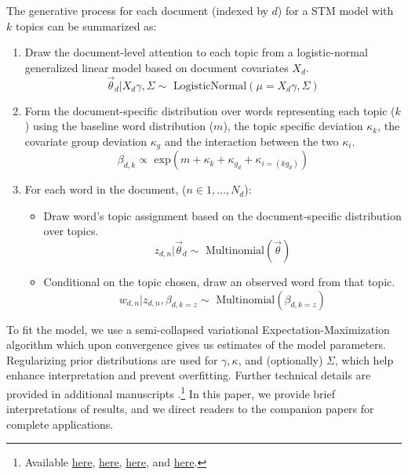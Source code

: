 \documentclass[article,shortnames]{jss}
\begin{document}
The generative process for each document (indexed by $d$) for a STM model with $k$ topics can be summarized as:

\begin{enumerate}
\item Draw the document-level attention to each topic from a logistic-normal generalized linear model based on document covariates $X_d$. \\
\begin{equation}\label{eqn:dgp1}
\vec{\theta}_d | X_d\gamma, \Sigma \sim \text{ LogisticNormal}(\mu = X_d\gamma, \Sigma)
\end{equation}
\item Form the document-specific distribution over words representing each topic ($k$) using the baseline word distribution ($m$), the topic specific deviation $\kappa_k$, the covariate group deviation $\kappa_g$ and the interaction between the two $\kappa_i$.\\
\begin{equation}\label{eqn:dgp2}
\beta_{d,k} \propto  \text{ exp}(m + \kappa_{k} + \kappa_{g_d} + \kappa_{i = (kg_d)})
\end{equation}
\item For each word in the document, ($n \in 1, \dots, N_d$):
\begin{itemize}
\item Draw word's topic assignment based on the document-specific distribution over topics.\\
\begin{equation}\label{eqn:dgp3}
z_{d, n} | \vec{\theta}_d \sim \text{ Multinomial}(\vec{\theta})
\end{equation}
\item Conditional on the topic chosen, draw an observed word from that topic.\\
\begin{equation}\label{eqn:dpg4}
 w_{d, n} | z_{d, n}, \beta_{d, k= z} \sim \text{ Multinomial}(\beta_{d, k = z})
\end{equation}
\end{itemize}
\end{enumerate}

To fit the model, we use a semi-collapsed variational Expectation-Maximization algorithm which upon convergence gives us estimates of the model parameters. Regularizing prior distributions are used for $\gamma, \kappa$, and (optionally) $\Sigma$, which help enhance interpretation and prevent overfitting. Further technical details are provided in additional manuscripts \citep{nips2013,stmjasa,ajps,TextComparative}.\footnote{Available \href{http://scholar.harvard.edu/files/bstewart/files/stmnips2013.pdf}{here}, \href{http://scholar.harvard.edu/files/dtingley/files/comparativepoliticstext.pdf}{here}, \href{http://scholar.harvard.edu/files/dtingley/files/topicmodelsopenendedexperiments.pdf}{here}, and \href{http://scholar.harvard.edu/files/dtingley/files/comparativepoliticstext.pdf}{here}.} In this paper, we provide brief interpretations of results, and we direct readers to the companion papers for complete applications.
\end{document}

